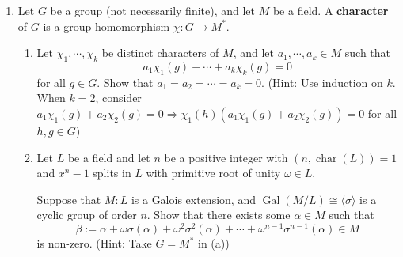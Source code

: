 \documentclass{article}
\begin{document}
\begin{enumerate}
\item Let $G$ be a group (not necessarily finite), and let $M$ be a field. A {\bf character} of $G$ is a group homomorphism $\chi: G \rightarrow M^{*}$. 

\begin{enumerate}
    \item Let $\chi_{1}, \cdots, \chi_{k}$ be distinct characters of $M$, and let $a_{1}, \cdots, a_{k} \in M$ such that
    \[
    a_{1} \chi_{1}(g) + \cdots + a_{k} \chi_{k}(g) = 0
    \]
    for all $g \in G$. Show that $a_{1} = a_{2} = \cdots = a_{k} = 0$. (Hint: Use induction on $k$. When $k = 2$, consider
    $a_1\chi_1(g)+a_2\chi_2(g) = 0  \Rightarrow  \chi_1(h)(a_1\chi_1(g) + a_2\chi_2(g)) = 0$ for all $h, g \in G$)

    \item Let $L$ be a field and let $n$ be a positive integer with $(n, \operatorname{char}(L)) = 1$ and $x^{n} - 1$ splits in $L$ with primitive root of unity $\omega \in L$. 
    
    Suppose that $M: L$ is a Galois extension, and $\operatorname{Gal}(M/L) \cong \langle \sigma \rangle$ is a cyclic group of order $n$. Show that there exists some $\alpha \in M$ such that 
    \[
    \beta := \alpha + \omega \sigma(\alpha) + \omega^{2} \sigma^{2}(\alpha) + \cdots + \omega^{n-1} \sigma^{n-1}(\alpha) \in M
    \]
    is non-zero. (Hint: Take $G = M^*$ in (a))
\end{enumerate}
    
\end{enumerate}
\end{document}
